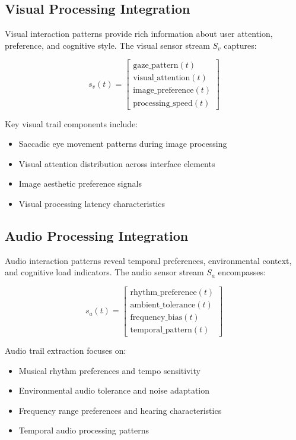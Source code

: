 \documentclass[12pt,a4paper]{article}
\begin{document}
\subsection{Visual Processing Integration}

Visual interaction patterns provide rich information about user attention, preference, and cognitive style. The visual sensor stream $S_v$ captures:

$$s_v(t) = \begin{bmatrix} \text{gaze\_pattern}(t) \\ \text{visual\_attention}(t) \\ \text{image\_preference}(t) \\ \text{processing\_speed}(t) \end{bmatrix}$$

Key visual trail components include:
\begin{itemize}
\item Saccadic eye movement patterns during image processing
\item Visual attention distribution across interface elements
\item Image aesthetic preference signals
\item Visual processing latency characteristics
\end{itemize}

\subsection{Audio Processing Integration}

Audio interaction patterns reveal temporal preferences, environmental context, and cognitive load indicators. The audio sensor stream $S_a$ encompasses:

$$s_a(t) = \begin{bmatrix} \text{rhythm\_preference}(t) \\ \text{ambient\_tolerance}(t) \\ \text{frequency\_bias}(t) \\ \text{temporal\_pattern}(t) \end{bmatrix}$$

Audio trail extraction focuses on:
\begin{itemize}
\item Musical rhythm preferences and tempo sensitivity
\item Environmental audio tolerance and noise adaptation
\item Frequency range preferences and hearing characteristics
\item Temporal audio processing patterns
\end{itemize}
\end{document}
